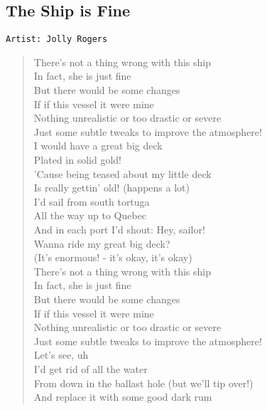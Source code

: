 \documentclass[11pt]{article}
\begin{document}
\subsection{The Ship is Fine}
\label{sec:org3b59816}
\begin{verbatim}
Artist: Jolly Rogers
\end{verbatim}
\begin{verse}
\vspace*{1em}
\vspace*{1em}
There's not a thing wrong with this ship\\
In fact, she is just fine\\
But there would be some changes\\
If if this vessel it were mine\\
Nothing unrealistic or too drastic or severe\\
Just some subtle tweaks to improve the atmosphere!\\
\vspace*{1em}
I would have a great big deck\\
Plated in solid gold!\\
'Cause being teased about my little deck\\
Is really gettin' old! (happens a lot)\\
I'd sail from south tortuga\\
All the way up to Quebec\\
And in each port I'd shout: Hey, sailor!\\
Wanna ride my great big deck?\\
(It's enormous! - it's okay, it's okay)\\
\vspace*{1em}
There's not a thing wrong with this ship\\
In fact, she is just fine\\
But there would be some changes\\
If if this vessel it were mine\\
Nothing unrealistic or too drastic or severe\\
Just some subtle tweaks to improve the atmosphere!\\
\vspace*{1em}
Let's see, uh\\
I'd get rid of all the water\\
From down in the ballast hole (but we'll tip over!)\\
And replace it with some good dark rum\\

\end{verse}
\end{document}
